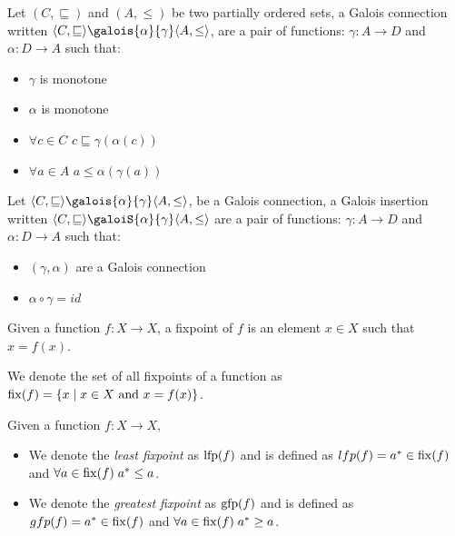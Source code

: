 \documentclass[
  10pt,       %
  twoside,    %
  a4paper,    %
  english,    %
  tikz,       %
  openright,  %
]{book}
\begin{document}
\begin{definition}
  Let $(C, \sqsubseteq)$ and $(A, \leq)$ be two partially ordered sets, a 
  Galois connection written $\langle C, \sqsubseteq \rangle 
  \galois{\alpha}{\gamma} \langle A, \leq \rangle$, are a pair of functions:
  $\gamma : A \to D$ and $\alpha : D \to A$ such that:
  \begin{itemize}
    \item $\gamma$ is monotone
    \item $\alpha$ is monotone
    \item $\forall c \in C$ $c \sqsubseteq \gamma(\alpha(c))$
    \item $\forall a \in A$ $a \leq \alpha(\gamma(a))$
  \end{itemize}
\end{definition}

\begin{definition}
  Let $\langle C, \sqsubseteq \rangle \galois{\alpha}{\gamma} \langle A, \leq 
  \rangle$, be a Galois connection, a Galois insertion written 
  $\langle C, \sqsubseteq \rangle \galoiS{\alpha}{\gamma} \langle A, \leq \rangle$
  are a pair of functions: $\gamma : A \to D$ and $\alpha : D \to A$ such that:
  \begin{itemize}
    \item $(\gamma, \alpha)$ are a Galois connection
    \item $\alpha \circ \gamma = id$
  \end{itemize}
\end{definition}

\begin{definition}[Fixpoint]
  Given a function $f : X \to X$, a fixpoint of $f$ is an element $x \in X$ 
  such that $x = f(x)$.

  We denote the set of all fixpoints of a function as $\mathrm{fix}(f) = 
  \{ x \mid x \in X \text{ and } x = f(x) \}$.
\end{definition}

\begin{definition}
  Given a function $f : X \to X$,
  \begin{itemize}
    \item We denote the \textit{least fixpoint} as $\mathrm{lfp}(f)$ and is defined as
      $lfp(f) = a^* \in \mathrm{fix}(f)$ and $\forall a \in \mathrm{fix}(f) \; a^* \leq a$.
    \item We denote the \textit{greatest fixpoint} as $\mathrm{gfp}(f)$ and is defined as
      $gfp(f) = a^* \in \mathrm{fix}(f)$ and $\forall a \in \mathrm{fix}(f) \; a^* \geq a$.
  \end{itemize}
\end{definition}
\end{document}
